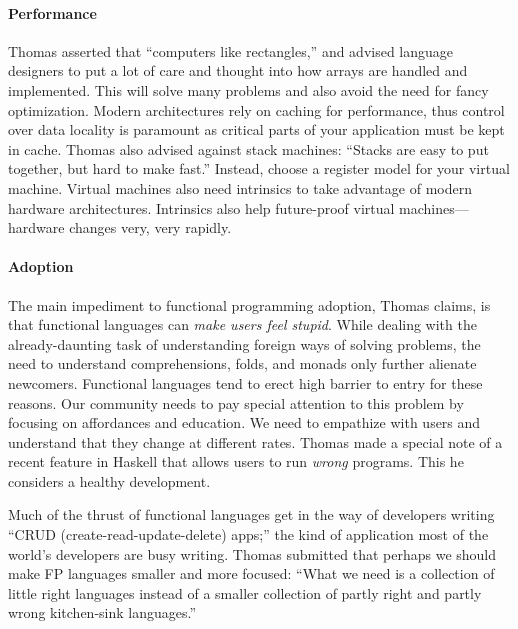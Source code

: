 \documentclass{jfp1}
\begin{document}
\paragraph{Performance} Thomas asserted that ``computers like
rectangles,'' and advised language designers to put a lot of care and
thought into how arrays are handled and implemented. This will solve
many problems and also avoid the need for fancy optimization. Modern
architectures rely on caching for performance, thus control over data
locality is paramount as critical parts of your application must be
kept in cache. Thomas also advised against stack machines: ``Stacks
are easy to put together, but hard to make fast.'' Instead, choose
a register model for your virtual machine. Virtual machines also
need intrinsics to take advantage of modern hardware architectures.
Intrinsics also help future-proof virtual machines---hardware changes
very, very rapidly.


\paragraph{Adoption} The main impediment to functional programming
adoption, Thomas claims, is that functional languages can \textit{make
users feel stupid}. While dealing with the already-daunting task of
understanding foreign ways of solving problems, the need to understand
comprehensions, folds, and monads only further alienate newcomers.
Functional languages tend to erect high barrier to entry for these
reasons. Our community needs to pay special attention to this problem
by focusing on affordances and education. We need to empathize with
users and understand that they change at different rates. Thomas made
a special note of a recent feature in Haskell that allows users to run
\textit{wrong} programs. This he considers a healthy development.

Much of the thrust of functional languages get in the way of
developers writing ``CRUD (create-read-update-delete) apps;'' the kind
of application most of the world's developers are busy writing. Thomas
submitted that perhaps we should make FP languages smaller and more
focused: ``What we need is a collection of little right languages
instead of a smaller collection of partly right and partly wrong
kitchen-sink languages.''
\end{document}
